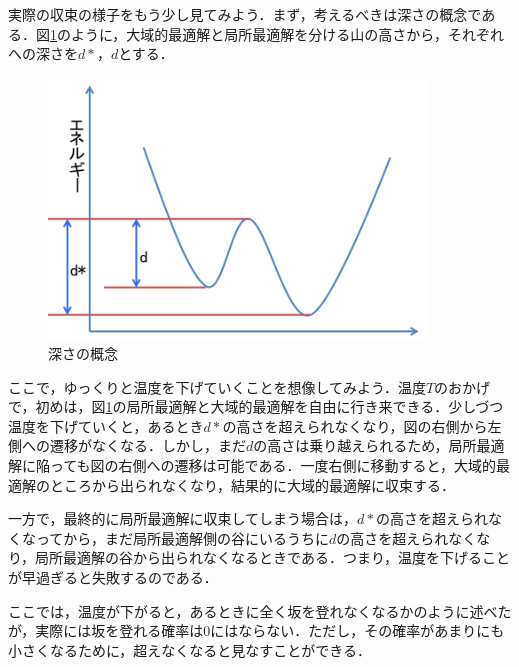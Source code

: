 \documentclass{jarticle}
\begin{document}
実際の収束の様子をもう少し見てみよう．まず，考えるべきは深さの概念である．図\ref{fig:depth}のように，大域的最適解と局所最適解を分ける山の高さから，それぞれへの深さを$d*$，$d$とする．
\begin{figure}[H]
\begin{center}
	\includegraphics[width=100mm]{image/depth.png}
	\caption{深さの概念}
	\label{fig:depth}
\end{center}
\end{figure}

ここで，ゆっくりと温度を下げていくことを想像してみよう．温度$T$のおかげで，初めは，図\ref{fig:depth}の局所最適解と大域的最適解を自由に行き来できる．少しづつ温度を下げていくと，あるとき$d*$の高さを超えられなくなり，図の右側から左側への遷移がなくなる．しかし，まだ$d$の高さは乗り越えられるため，局所最適解に陥っても図の右側への遷移は可能である．一度右側に移動すると，大域的最適解のところから出られなくなり，結果的に大域的最適解に収束する．

一方で，最終的に局所最適解に収束してしまう場合は，$d*$の高さを超えられなくなってから，まだ局所最適解側の谷にいるうちに$d$の高さを超えられなくなり，局所最適解の谷から出られなくなるときである．つまり，温度を下げることが早過ぎると失敗するのである．

ここでは，温度が下がると，あるときに全く坂を登れなくなるかのように述べたが，実際には坂を登れる確率は$0$にはならない．ただし，その確率があまりにも小さくなるために，超えなくなると見なすことができる．

\end{document}
